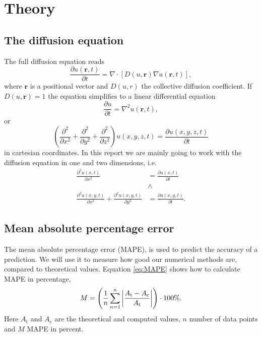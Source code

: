 \documentclass[reprint, english,notitlepage,nofootinbib]{revtex4-1}  %
\begin{document}
\section{Theory}

\subsection*{The diffusion equation}

The full diffusion equation reads
\begin{equation*}
	\frac{\partial u(\mathbf{r}, t)}{\partial t} = \nabla \cdot \left[D(u, \mathbf{r})\nabla u(\mathbf{r}, t)\right],
\end{equation*}
where $\mathbf{r}$ is a positional vector and $D(u,r)$ the collective diffusion coefficient. If $D(u,\mathbf{r}) = 1$ the equation simplifies to a linear differential equation
\begin{equation*}
	\frac{\partial u}{\partial t} = \nabla^2u(\mathbf{r}, t),
\end{equation*}
or
\begin{equation}
	\label{eq:diffusion_equation}
	\left(\frac{\partial^2}{\partial x^2} + \frac{\partial^2}{\partial y^2} + \frac{\partial^2}{\partial z^2}\right) u(x,y,z,t) = \frac{\partial u(x,y,z,t)}{\partial t}
\end{equation}
in cartesian coordinates. In this report we are mainly going to work with the diffusion equation in one and two dimensions, i.e.
\begin{align*}
	 \frac{\partial^2 u(x,t)}{\partial x^2} &= \frac{\partial u(x,t)}{\partial t} \\ &\wedge \\ \frac{\partial^2u(x, y,t)}{\partial x^2} + \frac{\partial^2u(x, y,t)}{\partial y^2} &= \frac{\partial u(x, y,t)}{\partial t}.
\end{align*}

\subsection*{Mean absolute percentage error}

The mean absolute percentage error (MAPE), is used to predict the accuracy of a prediction. We will use it to measure how good our numerical methods are, compared to theoretical values. Equation \eqref{eq:MAPE} shows how to calculate MAPE in percentage,
\begin{equation}
	\label{eq:MAPE}
	M = \left(\frac{1}{n}\sum_{n=1}^{n}\abs{\frac{A_\text{t} - A_\text{c}}{A_\text{t}}}\right)\cdot 100\%.
\end{equation}
Here $A_\text{t}$ and $A_\text{c}$ are the theoretical and computed values, $n$ number of data points and $M$ MAPE in percent.
\end{document}
